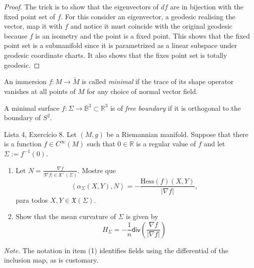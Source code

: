 \begin{proof}
The trick is to show that the eigenvectors of $df$ are in bijection with the
fixed point set of $f$. For this consider an eigenvector, a geodesic realising 
the vector, map it with $f$ and notice it must coincide with the original 
geodesic because $f$ is an isometry and the point is a fixed point. This shows
that the fixed point set is a submanifold since it is parametrized as a linear
subspace under geodesic coordinate charts. It also shows that the fixes point
set is totally geodesic.
\end{proof}

\begin{definition}
\label{definition-minimal-immersion}
An immersion $f:M\to\tilde{M}$ is called {\it minimal} if the trace of its shape
operator vanishes at all points of $M$ for any choice of normal vector field.
\end{definition}

\begin{definition}
\label{definition-minimal-free-boundary-immersion}
A minimal surface $f:\Sigma\to \mathbb{B}^3\subset \mathbb{R}^3$ 
is of {\it free boundary} if it is orthogonal to the boundary of $S^2$. 
\end{definition}

\begin{exercise}
\label{exercise-mean-curvature}
Lista 4, Exercício 8. Let $(M,g)$ be a Riemannian manifold. Suppose that there
is a function $f \in C^\infty(M)$ such that $0 \in \mathbb{R}$ is a regular
value of $f$ and let $\Sigma:=f^{-1}(0)$.
\begin{enumerate}
\item Let $N=\frac{\nabla f}{|\nabla f| \in \mathfrak{X}^\perp(\Sigma)}$. Mostre
que
$$
\left<\alpha_{\Sigma}(X,Y),N\right>=-\frac{\text{Hess}(f)(X,Y)}{|\nabla f|},
$$
para todos $X,Y \in \mathfrak{X}(\Sigma)$.

\item Show that the mean curvature of $\Sigma$ is given by
$$
H_{\Sigma}=-\frac{1}{n}\mathsf{div}\left(\frac{\nabla f}{|\nabla f|}\right)
$$
\end{enumerate}
{\it Note.} The notation in item (1) identifies fields using the differential of
the inclusion map, as is customary.
\end{exercise}

